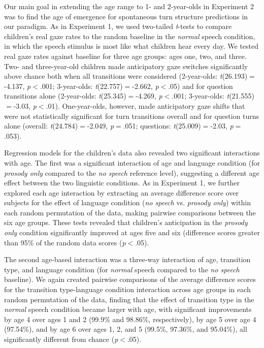 \documentclass[authoryear, 12pt]{elsarticle}
\begin{document}
Our main goal in extending the age range to 1- and 2-year-olds in Experiment 2 was to find the age of emergence for spontaneous turn structure predictions in our paradigm. As in Experiment 1, we used two-tailed \textit{t}-tests to compare children's real gaze rates to the random baseline in the \textit{normal} speech condition, in which the speech stimulus is most like what children hear every day. We tested real gaze rates against baseline for three age groups: ages one, two, and three. Two- and three-year-old children made anticipatory gaze switches significantly above chance both when all transitions were considered (2-year-olds: \textit{t}(26.193)$=$-4.137, \textit{p}$<$.001; 3-year-olds: \textit{t}(22.757)$=$-2.662, \textit{p}$<$.05) and for question transitions alone (2-year-olds: \textit{t}(25.345)$=$-4.269, \textit{p}$<$.001; 3-year-olds: \textit{t}(21.555)$=$-3.03, \textit{p}$<$.01). One-year-olds, however, made anticipatory gaze shifts that were not statistically significant for turn transitions overall and for question turns alone (overall: \textit{t}(24.784)$=$-2.049, \textit{p}$=$.051; questions: \textit{t}(25.009)$=$-2.03, \textit{p}$=$.053).

Regression models for the children's data also revealed two significant interactions with age. The first was a significant interaction of age and language condition (for \textit{prosody only} compared to the \textit{no speech} reference level), suggesting a different age effect between the two linguistic conditions. As in Experiment 1, we further explored each age interaction by extracting an average difference score over subjects for the effect of language condition (\textit{no speech} vs. \textit{prosody only}) within each random permutation of the data, making pairwise comparisons between the six age groups. These tests revealed that children's anticipation in the \textit{prosody only} condition significantly improved at ages five and six (difference scores greater than 95\% of the random data scores (\textit{p}$<$.05).

The second age-based interaction was a three-way interaction of age, transition type, and language condition (for \textit{normal} speech compared to the \textit{no speech} baseline). We again created pairwise comparisons of the average difference scores for the transition type-language condition interaction across age groups in each random permutation of the data, finding that the effect of transition type in the \textit{normal} speech condition became larger with age, with significant improvements by age 4 over ages 1 and 2 (99.9\% and 98.86\%, respectively), by age 5 over age 4 (97.54\%), and by age 6 over ages 1, 2, and 5 (99.5\%, 97.36\%, and 95.04\%), all significantly different from chance (\textit{p}$<$.05).
\end{document}
